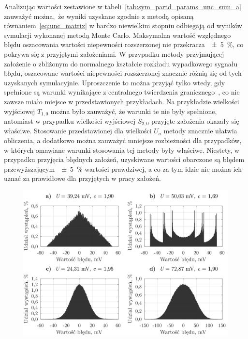 Analizując wartości zestawione w tabeli~\ref{tab:sym_partd_params_unc_sum_a} zauważyć można, że wyniki uzyskane zgodnie z metodą opisaną równaniem~\eqref{eq:unc_matrix} w bardzo niewielkim stopniu odbiegają od wyników symulacji wykonanej metodą Monte Carlo. Maksymalna wartość względnego błędu oszacowania wartości niepewności rozszerzonej nie przekracza~\qty{\pm 5}{\percent}, co pokrywa się z przyjętymi założeniami. W przypadku metody przyjmującej założenie o zbliżonym do normalnego kształcie rozkładu wypadkowego sygnału błędu, oszacowane wartości niepewności rozszerzonej znacznie różnią się od tych uzyskanych symulacyjnie. Uproszczenie to można przyjąć tylko wtedy, gdy spełnione są warunki wynikające z centralnego twierdzenia granicznego~\cite{jcgm_guide, grimmett_probability}, co nie zawsze miało miejsce w przedstawionych przykładach. Na przykładzie wielkości wyjściowej $T_{1,0}$ można było zauważyć, że warunki te nie były spełnione, natomiast w przypadku wielkości wyjściowej $S_{2,0}$ przyjęte założenia okazały się właściwe. Stosowanie przedstawionej dla wielkości $U_{a}$ metody znacznie ułatwia obliczenia, a dodatkowo można zauważyć mniejsze rozbieżności dla przypadków, w których omawiane warunki stosowania tej metody były właściwe. Niestety, w przypadku przyjęcia błędnych założeń, uzyskiwane wartości obarczone są błędem przewyższającym~\qty{\pm 5}{\percent} wartości prawdziwej, a co za tym idzie nie można ich uznać za prawidłowe dla przyjętych w pracy założeń.

\begin{figure}[htb!]
\includegraphics{obrazki/hist_part_S}
\end{figure}


